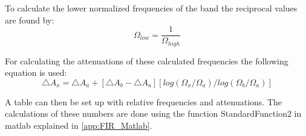 To calculate the lower normalized frequencies of the band the reciprocal values are found by:
\begin{equation}
\Omega_{low} = \frac{1}{\Omega_{high}}
\end{equation}

For calculating the attenuations of these calculated frequencies the following equation is used:
\begin{equation}
\triangle A_x=\triangle A_a+[\triangle A_b-\triangle A_a][log(\Omega_x/\Omega_a)/log(\Omega_b/\Omega_a)]
\end{equation}
\begin{where}
\end{where}

A table can then be set up with relative frequencies and attenuations. The calculations of these numbers are done using the function StandardFunction2 in matlab explained in \autoref{app:FIR_Matlab}.

